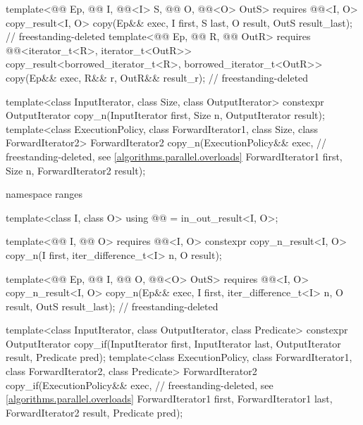 \begin{codeblock}
{{    template<@@ Ep, @@ I, @@<I> S,
             @@ O, @@<O> OutS>
      requires @@<I, O>
      copy_result<I, O>
        copy(Ep&& exec, I first, S last, O result, OutS result_last);       // freestanding-deleted
    template<@@ Ep, @@ R, @@ OutR>
      requires @@<iterator_t<R>, iterator_t<OutR>>
      copy_result<borrowed_iterator_t<R>, borrowed_iterator_t<OutR>>
        copy(Ep&& exec, R&& r, OutR&& result_r);                            // freestanding-deleted
  }

  template<class InputIterator, class Size, class OutputIterator>
    constexpr OutputIterator copy_n(InputIterator first, Size n,
                                    OutputIterator result);
  template<class ExecutionPolicy, class ForwardIterator1, class Size,
           class ForwardIterator2>
    ForwardIterator2 copy_n(ExecutionPolicy&& exec,             // freestanding-deleted, see \ref{algorithms.parallel.overloads}
                            ForwardIterator1 first, Size n,
                            ForwardIterator2 result);

  namespace ranges {
    template<class I, class O>
      using @@ = in_out_result<I, O>;

    template<@@ I, @@ O>
      requires @@<I, O>
      constexpr copy_n_result<I, O>
        copy_n(I first, iter_difference_t<I> n, O result);

    template<@@ Ep, @@ I, @@ O,
             @@<O> OutS>
      requires @@<I, O>
      copy_n_result<I, O>
        copy_n(Ep&& exec, I first, iter_difference_t<I> n, O result,
               OutS result_last);                               // freestanding-deleted
  }

  template<class InputIterator, class OutputIterator, class Predicate>
    constexpr OutputIterator copy_if(InputIterator first, InputIterator last,
                                     OutputIterator result, Predicate pred);
  template<class ExecutionPolicy, class ForwardIterator1, class ForwardIterator2,
           class Predicate>
    ForwardIterator2 copy_if(ExecutionPolicy&& exec,            // freestanding-deleted, see \ref{algorithms.parallel.overloads}
                             ForwardIterator1 first, ForwardIterator1 last,
                             ForwardIterator2 result, Predicate pred);

}
\end{codeblock}
